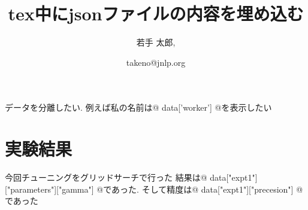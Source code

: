 \documentclass[twocolumn,uplatex]{jsarticle}
\begin{document}
\title{tex中にjsonファイルの内容を埋め込む} 
\author{
    若手 太郎,
}
\date{takeno@jnlp.org} 
\maketitle

データを分離したい.
例えば私の名前は{@ data['worker'] @}を表示したい

\section{実験結果}
今回チューニングをグリッドサーチで行った
結果は{@ data["expt1"]["parameters"]["gamma"] @}であった.
そして精度は{@ data["expt1"]["precesion"] @}であった
\end{document}
